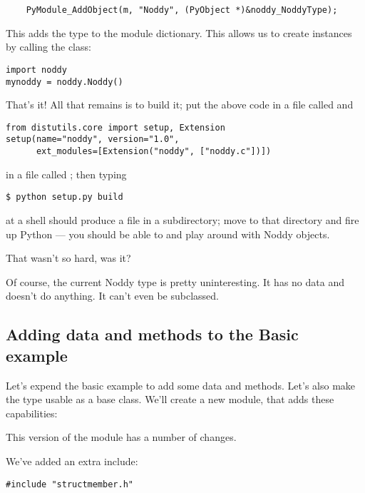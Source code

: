 \begin{verbatim}
    PyModule_AddObject(m, "Noddy", (PyObject *)&noddy_NoddyType);
\end{verbatim}

This adds the type to the module dictionary.  This allows us to create
 instances by calling the  class:

\begin{verbatim}
import noddy
mynoddy = noddy.Noddy()
\end{verbatim}

That's it!  All that remains is to build it; put the above code in a
file called  and

\begin{verbatim}
from distutils.core import setup, Extension
setup(name="noddy", version="1.0",
      ext_modules=[Extension("noddy", ["noddy.c"])])
\end{verbatim}

in a file called ; then typing

\begin{verbatim}
$ python setup.py build
\end{verbatim} %

at a shell should produce a file  in a subdirectory;
move to that directory and fire up Python --- you should be able to
 and play around with Noddy objects.

That wasn't so hard, was it?

Of course, the current Noddy type is pretty uninteresting. It has no
data and doesn't do anything. It can't even be subclassed.

\subsection{Adding data and methods to the Basic example}
    
Let's expend the basic example to add some data and methods.  Let's
also make the type usable as a base class. We'll create
a new module,  that adds these capabilities:



This version of the module has a number of changes.

We've added an extra include:

\begin{verbatim}
#include "structmember.h"
\end{verbatim}

